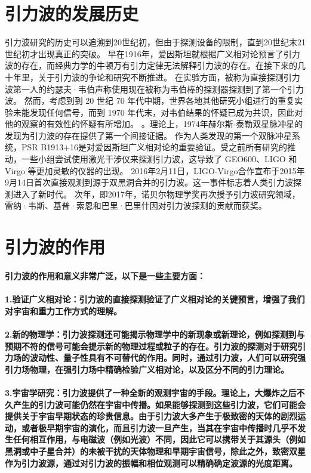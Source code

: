\documentclass{article}
\begin{document}
\section{引力波的发展历史}
引力波研究的历史可以追溯到20世纪初，但由于探测设备的限制，直到20世纪末21世纪初才出现真正的突破。
早在1916年，爱因斯坦就根据广义相对论预言了引力波的存在，而经典力学的牛顿万有引力定律无法解释引力波的存在。在接下来的几十年里，关于引力波的争论和研究不断推进。 在实验方面，被称为直接探测引力波第一人的约瑟夫·韦伯声称使用现在被称为韦伯棒的探测器探测到了第一个引力波。 然而，考虑到到 20 世纪 70 年代中期，世界各地其他研究小组进行的重复实验未能发现任何信号，而到 1970 年代末，对韦伯结果的怀疑已成为共识，因此对他的观察的有效性的怀疑有所增加。 。理论上，1974年赫尔斯-泰勒双星脉冲星的发现为引力波的存在提供了第一个间接证据。 作为人类发现的第一个双脉冲星系统，PSR B1913+16是对爱因斯坦广义相对论的重要验证。受之前所有研究的推动，一些小组尝试使用激光干涉仪来探测引力波，这导致了 GEO600、LIGO 和 Virgo 等更加灵敏的仪器的出现。 
2016年2月11日，LIGO-Virgo合作宣布于2015年9月14日首次直接观测到源于双黑洞合并的引力波。这一事件标志着人类引力波探测进入了新时代。 次年，即2017年，诺贝尔物理学奖再次授予引力波研究领域，雷纳·韦斯、基普·索恩和巴里·巴里什因对引力波探测的贡献而获奖。 

\section{引力波的作用}
\paragraph{引力波的作用和意义非常广泛，以下是一些主要方面：}
\paragraph{1.验证广义相对论：引力波的直接探测验证了广义相对论的关键预言，增强了我们对宇宙和重力工作方式的理解。}
\paragraph{2.新的物理学：引力波探测还可能揭示物理学中的新现象或新理论，例如探测到与预期不符的信号可能会提示新的物理过程或粒子的存在。引力波的探测对于研究引力场的波动性、量子性具有不可替代的作用。同时，通过引力波，人们可以研究强引力场物理，在强引力场中精确检验广义相对论，以及区分不同的引力理论。}
\paragraph{3.宇宙学研究：引力波提供了一种全新的观测宇宙的手段。理论上，大爆炸之后不久产生的引力波可能仍然在宇宙中传播。如果能够探测到这些引力波，它们可能会提供关于宇宙早期状态的珍贵信息。由于引力波大多产生于极致密的天体的剧烈运动，或者极早期宇宙的演化，而且引力波一旦产生，当其在宇宙中传播时几乎不发生任何相互作用，与电磁波（例如光波）不同，因此它可以携带关于其源头（例如黑洞或中子星合并）的未被干扰的天体物理和早期宇宙信号，除此之外，致密双星作为引力波源，通过对引力波的振幅和相位观测可以精确确定波源的光度距离。}
\end{document}
